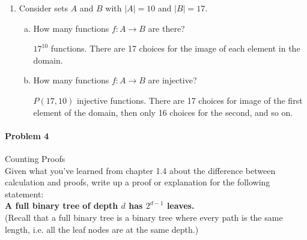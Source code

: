 \documentclass[11pt, a4paper]{article}
\newcommand\setItemNumber[1]{\setcounter{enumi}{\numexpr#1-1\relax}}
\begin{document}
\begin{enumerate}
        \setItemNumber{12}
        \item Consider sets $A$ and $B$ with $|A| = 10$ and $|B| = 17$.
            \begin{enumerate}[(a)]
                \item How many functions $f: A\rightarrow B$ are there?

                    $17^10$ functions. There are 17 choices for the image of each element in the domain.

                \item How many functions $f: A\rightarrow B$ are injective?

                    $P(17, 10)$ injective functions. There are 17 choices for image of the first element of the domain, then only 16 choices for the second, and so on.

            \end{enumerate}

    \end{enumerate}


	
	\paragraph{Problem 4} Counting Proofs\\

	Given what you've learned from chapter 1.4 about the difference between calculation and proofs, write up a proof or explanation for the following statement:\\

	\textbf{A full binary tree of depth $d$ has $2^{d-1}$ leaves.} \\

	(Recall that a full binary tree is a binary tree where every path is the same length, i.e. all the leaf nodes are at the same depth.)
	
		
\end{document}
